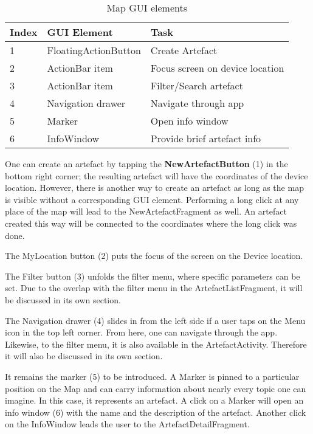 \begin{table}[h]
\centering
\begin{tabular}{|l|l|l|}
\hline
\textbf{Index} & \textbf{GUI Element} & \textbf{Task}                   \\ \hline
1              & FloatingActionButton & Create Artefact                 \\ \hline
2              & ActionBar item       & Focus screen on device location \\ \hline
3              & ActionBar item       & Filter/Search artefact          \\ \hline
4              & Navigation drawer    & Navigate through app            \\ \hline
5              & Marker               & Open info window                \\ \hline
6              & InfoWindow           & Provide brief artefact info     \\ \hline
\end{tabular}
\caption{Map GUI elements}
\label{table:map_gui_elements}
\end{table}



One can create an artefact by tapping the \textbf{NewArtefactButton} (1) in the bottom right corner; the resulting artefact will have the coordinates of the device location. However, there is another way to create an artefact as long as the map is visible without a corresponding GUI element. Performing a long click at any place of the map will lead to the NewArtefactFragment as well. An artefact created this way will be connected to the coordinates where the long click was done.

The MyLocation button (2) puts the focus of the screen on the Device location.

The Filter button (3) unfolds the filter menu, where specific parameters can be set. Due to the overlap with the filter menu in the ArtefactListFragment, it will be discussed in its own section.

The Navigation drawer (4) slides in from the left side if a user taps on the Menu icon in the top left corner. From here, one can navigate through the app. Likewise, to the filter menu, it is also available in the ArtefactActivity. Therefore it will also be discussed in its own section.

It remains the marker (5) to be introduced. A Marker is pinned to a particular position on the Map and can carry information about nearly every topic one can imagine. In this case, it represents an artefact. A click on a Marker will open an info window (6) with the name and the description of the artefact. Another click on the InfoWindow leads the user to the ArtefactDetailFragment.

